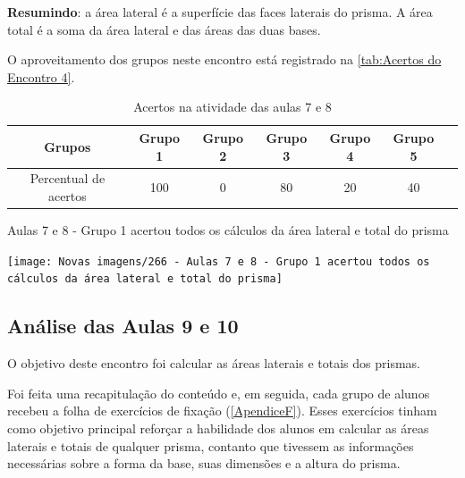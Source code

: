 \textbf{Resumindo}: a área lateral é a superfície das faces laterais do prisma. A área total é a soma da área lateral e das áreas das duas bases.

O aproveitamento dos grupos neste encontro está registrado na \autoref{tab:Acertos do Encontro 4}.

\begin{table}[htbp] \centering
    \caption{Acertos na atividade das aulas 7 e 8} \label{tab:Acertos do Encontro 4}
    \begin{tabular}{|c|c|c|c|c|c|c|}
        \hline
        \textbf{Grupos}       & \textbf{Grupo 1} & \textbf{Grupo 2} & \textbf{Grupo 3} & \textbf{Grupo 4} & \textbf{Grupo 5} \\
        \hline
        Percentual de acertos & 100              & 0                & 80               & 20               & 40               \\
        \hline
    \end{tabular}
    \legend{\legendaTabela}
\end{table}

\begin{CenteredFigure}
    \caption{Aulas 7 e 8 - Grupo 1 acertou todos os cálculos da área lateral e total do prisma} \label{fig: 266 - Aulas 7 e 8 - Grupo 1 acertou todos os calculos da area lateral e total do prisma}
    \texttt{[image: Novas imagens/266 - Aulas 7 e 8 - Grupo 1 acertou todos os cálculos da área lateral e total do prisma]}
    \legend{\autoria}
\end{CenteredFigure}


\subsection{Análise das Aulas 9 e 10}

O objetivo deste encontro foi calcular as áreas laterais e totais dos prismas.

Foi feita uma recapitulação do conteúdo e, em seguida, cada grupo de alunos recebeu a folha de exercícios de fixação (\autoref{ApendiceF}). Esses exercícios tinham como objetivo principal reforçar a habilidade dos alunos em calcular as áreas laterais e totais de qualquer prisma, contanto que tivessem as informações necessárias sobre a forma da base, suas dimensões e a altura do prisma.

